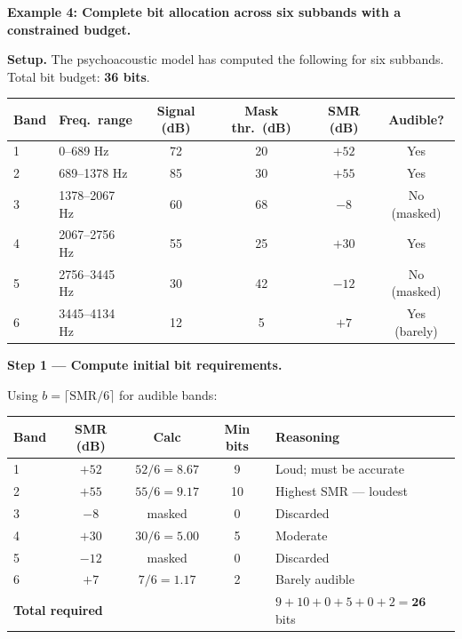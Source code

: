 \begin{examplebox}
\textbf{Example 4: Complete bit allocation across six subbands with a constrained budget.}

\medskip
\noindent\textbf{Setup.} The psychoacoustic model has computed the following for six subbands. Total bit budget: \textbf{36 bits}.

\begin{center}
\setlength{\tabcolsep}{6pt}
\begin{tabular}{llcccc}
\toprule
Band & Freq.\ range & Signal (dB) & Mask thr.\ (dB) & SMR (dB) & Audible? \\
\midrule
1 & 0--689 Hz      & 72 & 20 & $+52$ & Yes \\
2 & 689--1378 Hz   & 85 & 30 & $+55$ & Yes \\
3 & 1378--2067 Hz  & 60 & 68 & $-8$  & No (masked) \\
4 & 2067--2756 Hz  & 55 & 25 & $+30$ & Yes \\
5 & 2756--3445 Hz  & 30 & 42 & $-12$ & No (masked) \\
6 & 3445--4134 Hz  & 12 &  5 & $+7$  & Yes (barely) \\
\bottomrule
\end{tabular}
\end{center}

\medskip
\noindent\textbf{Step 1 --- Compute initial bit requirements.}

Using $b = \lceil \text{SMR}/6 \rceil$ for audible bands:

\begin{center}
\setlength{\tabcolsep}{6pt}
\begin{tabular}{lcccl}
\toprule
Band & SMR (dB) & Calc & Min bits & Reasoning \\
\midrule
1 & $+52$ & $52/6 = 8.67$ & 9 & Loud; must be accurate \\
2 & $+55$ & $55/6 = 9.17$ & 10 & Highest SMR --- loudest \\
3 & $-8$  & masked & 0 & Discarded \\
4 & $+30$ & $30/6 = 5.00$ & 5 & Moderate \\
5 & $-12$ & masked & 0 & Discarded \\
6 & $+7$  & $7/6 = 1.17$  & 2 & Barely audible \\
\midrule
\multicolumn{4}{l}{\textbf{Total required}} & $9+10+0+5+0+2 = \mathbf{26}$ bits \\
\bottomrule
\end{tabular}
\end{center}


\end{examplebox}
